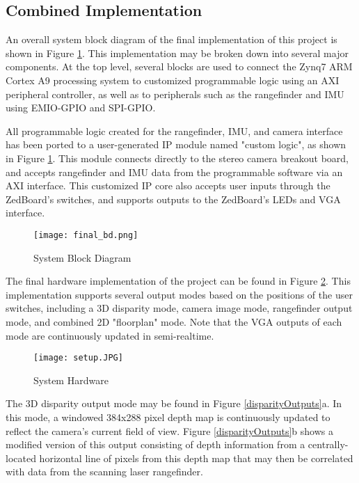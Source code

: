 \subsection{Combined Implementation}
An overall system block diagram of the final implementation of this project is shown in Figure \ref{finalBD}. This implementation may be broken down into several major components. At the top level, several blocks are used to connect the Zynq7 ARM Cortex A9 processing system to customized programmable logic using an AXI peripheral controller, as well as to peripherals such as the rangefinder and IMU using EMIO-GPIO and SPI-GPIO. 
\par
All programmable logic created for the rangefinder, IMU, and camera interface has been ported to a user-generated IP module named "custom logic", as shown in Figure \ref{finalBD}. This module connects directly to the stereo camera breakout board, and accepts rangefinder and IMU data from the programmable software via an AXI interface. This customized IP core also accepts user inputs through the ZedBoard's switches, and supports outputs to the ZedBoard's LEDs and VGA interface. 
\par
\begin{figure}[!htb] 
	\centerline{
	\texttt{[image: final\_bd.png]}
	}
	\caption{System Block Diagram}
	\label{finalBD}
\end{figure}
\par
The final hardware implementation of the project can be found in Figure 
\ref{finalHW}. This implementation supports several output modes based on the positions of the user switches, including a 3D disparity mode, camera image mode, rangefinder output mode, and combined 2D "floorplan" mode. Note that the VGA outputs of each mode are continuously updated in semi-realtime. 
\begin{figure}[H]  
 	\centerline{
	\texttt{[image: setup.JPG]}
	}
	\caption{System Hardware}
	\label{finalHW}
\end{figure}
\par
The 3D disparity output mode may be found in Figure \ref{disparityOutputs}a. In this mode, a windowed 384x288 pixel depth map is continuously updated to reflect the camera's current field of view. Figure \ref{disparityOutputs}b shows a modified version of this output consisting of depth information from a centrally-located horizontal line of pixels from this depth map that may then be correlated with data from the scanning laser rangefinder. 
\par
